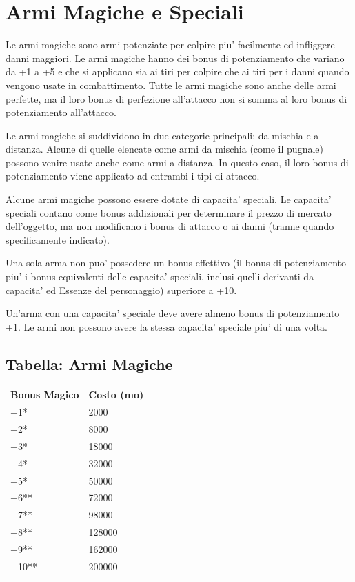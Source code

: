 \documentclass[a4paper,11pt,twoside,openany]{book}
\begin{document}
{\pagebreak

\section{Armi Magiche e Speciali}

\label{armi-magiche-e-speciali}

Le armi magiche sono armi potenziate per colpire piu' facilmente ed infliggere danni maggiori. Le armi magiche hanno dei bonus di potenziamento che variano da +1 a +5 e che si applicano sia ai tiri per colpire che ai tiri per i danni quando vengono usate in combattimento. Tutte le armi magiche sono anche delle armi perfette, ma il loro bonus di perfezione all'attacco non si somma al loro bonus di potenziamento all'attacco.

Le armi magiche si suddividono in due categorie principali: da mischia e a distanza. Alcune di quelle elencate come armi da mischia (come il pugnale) possono venire usate anche come armi a distanza. In questo caso, il loro bonus di potenziamento viene applicato ad entrambi i tipi di attacco.

Alcune armi magiche possono essere dotate di capacita' speciali. Le capacita' speciali contano come bonus addizionali per determinare il prezzo di mercato dell'oggetto, ma non modificano i bonus di attacco o ai danni (tranne quando specificamente indicato).

Una sola arma non puo' possedere un bonus effettivo (il bonus di potenziamento piu' i bonus equivalenti delle capacita' speciali, inclusi quelli derivanti da capacita' ed Essenze del personaggio) superiore a +10. 

Un'arma con una capacita' speciale deve avere almeno bonus di potenziamento +1. Le armi non possono avere la stessa capacita' speciale piu' di una volta.



\subsection{Tabella: Armi Magiche}

\label{tabella-armi-magiche}

\begin{tabular}{ll}
\toprule
\textbf{Bonus Magico} & \textbf{Costo (mo)}\tabularnewline
+1{*} & 2000\tabularnewline
+2{*} & 8000\tabularnewline
+3{*} & 18000\tabularnewline
+4{*} & 32000\tabularnewline
+5{*} & 50000\tabularnewline
+6{*}{*} & 72000\tabularnewline
+7{*}{*} & 98000\tabularnewline
+8{*}{*} & 128000\tabularnewline
+9{*}{*} & 162000\tabularnewline
+10{*}{*} & 200000\tabularnewline


\end{tabular}}
\end{document}
